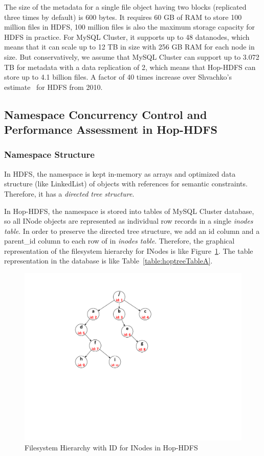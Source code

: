 \documentclass[runningheads,a4paper]{llncs}
\begin{document}
The size of the metadata for a single file object having two blocks (replicated three times by default) is 600 bytes. It requires 60 GB of RAM to store 100 million files in HDFS, 100 million files is also the maximum storage capacity for HDFS in practice. For MySQL Cluster, it supports up to 48 datanodes, which means that it can scale up to 12 TB in size with 256 GB RAM for each node in size. But conservatively, we assume that MySQL Cluster can support up to 3.072 TB for metadata with a data replication of 2, which means that Hop-HDFS can store up to 4.1 billion files. A factor of 40 times increase over Shvachko's estimate~\cite{shvachko2010hdfs} for HDFS from 2010.

\subsection{Namespace Concurrency Control and Performance Assessment in Hop-HDFS}
\subsubsection{Namespace Structure}
In HDFS, the namespace is kept in-memory as arrays and optimized data structure (like LinkedList) of objects with references for semantic constraints. Therefore, it has a \textit{directed tree structure}.

In Hop-HDFS, the namespace is stored into tables of MySQL Cluster database, so all INode objects are represented as individual row records in a single \textit{inodes table}. In order to preserve the directed tree structure, we add an id column and a parent\_id column to each row of in \textit{inodes table}. Therefore, the graphical representation of the filesystem hierarchy for INodes is like Figure~\ref{fig:hoptreeA}. The table representation in the database is like Table~\ref{table:hoptreeTableA}.

\begin{figure}[h]
	\centering
	\includegraphics[scale=0.7]{hoptree.pdf}
	\caption{Filesystem Hierarchy with ID for INodes in Hop-HDFS}
	\label{fig:hoptreeA}
\end{figure}
\end{document}

